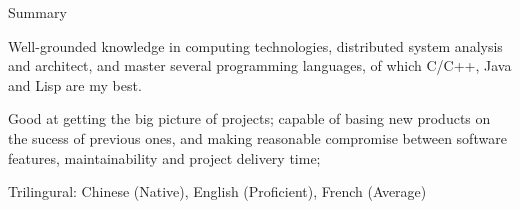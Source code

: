 \documentclass{resume} %
\begin{document}
\begin{rSection}{Summary}

\item Well-grounded knowledge in computing technologies, distributed system analysis and architect,
 and master several programming languages, of which C/C++, Java and Lisp are my best.
\item Good at getting the big picture of projects; capable of basing new products on the sucess of previous ones,
 and making reasonable compromise between software features, maintainability and project delivery time;
\item Trilingural: Chinese (Native), English (Proficient), French (Average)
\end{rSection}





\end{document}
